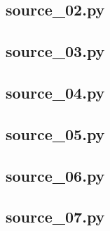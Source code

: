 \documentclass{cumcmthesis}
\begin{document}
  \subsection{source\_02.py}
    

  \subsection{source\_03.py}
    

  \subsection{source\_04.py}
    

  \subsection{source\_05.py}
    

  \subsection{source\_06.py}
    

  \subsection{source\_07.py}
    
\end{document}
